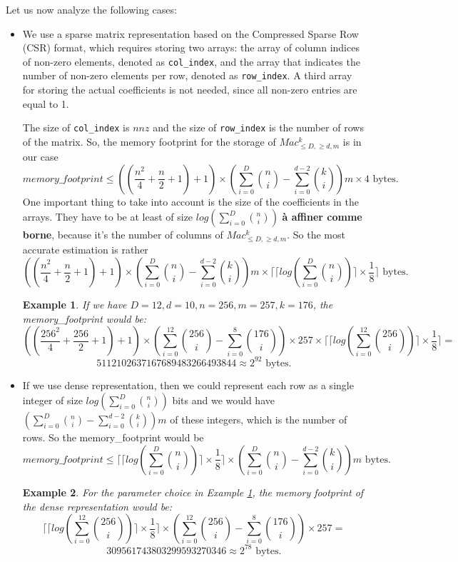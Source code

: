 \documentclass[english]{article}
\newtheorem{example}{Example}[section]
\begin{document}
		Let us now analyze the following cases:
		\begin{itemize}
			\item We use a sparse matrix representation based on the Compressed Sparse Row (CSR) format, which requires storing two arrays: the array of column indices of non-zero elements, denoted as \texttt{col\_index}, and the array that indicates the number of non-zero elements per row, denoted as \texttt{row\_index}. A third array for storing the actual coefficients is not needed, since all non-zero entries are equal to 1.
			
			The size of \texttt{col\_index} is $nnz$ and the size of \texttt{row\_index} is the number of rows of the matrix.
			So, the memory footprint for the storage of $Mac_{\leq D, \geq d, m}^k$ is in our case
			$$
				memory\_footprint \leq \left(\left(\frac{n^2}{4} + \frac{n}{2} + 1\right) + 1\right) \times \left(\sum_{i=0}^{D}\binom{n}{i} - \sum_{i=0}^{d-2}\binom{k}{i}\right)m \times 4 \text{ bytes}.
			$$
			One important thing to take into account is the size of the coefficients in the arrays. They have to be at least of size $log\left(\sum_{i=0}^{D} \binom{n}{i}\right)$ \textbf{à affiner comme borne}, because it's the number of columns of $Mac_{\leq D, \geq d, m}^k$. So the most accurate estimation is rather
			$$
				\left(\left(\frac{n^2}{4} + \frac{n}{2} + 1\right) + 1\right) \times \left(\sum_{i=0}^{D}\binom{n}{i} - \sum_{i=0}^{d-2}\binom{k}{i}\right)m \times \lceil \lceil log\left(\sum_{i=0}^{D} \binom{n}{i}\right) \rceil \times \frac{1}{8} \rceil \text{ bytes}.
			$$
			\begin{example}\label{exempleCSR}
				If we have $D = 12, d = 10, n = 256, m = 257, k=176$, the memory\_footprint would be:
				$$
					\left(\left( \frac{256^2}{4} + \frac{256}{2} + 1 \right) + 1 \right) \times \left(\sum_{i=0}^{12} \binom{256}{i} - \sum_{i=0}^{8} \binom{176}{i}\right) \times 257 \times \lceil \lceil log\left(\sum_{i=0}^{12} \binom{256}{i}\right) \rceil \times \frac{1}{8} \rceil = $$ $$ 5112102637167689483266493844 \approx 2^{92} \text{ bytes}.
				$$
			\end{example}
			\item If we use dense representation, then we could represent each row as a single integer of size $log\left(\sum_{i=0}^{D} \binom{n}{i}\right)$ bits and we would have $\left(\sum_{i=0}^{D}\binom{n}{i} - \sum_{i=0}^{d-2}\binom{k}{i}\right)m$ of these integers, which is the number of rows. So the memory\_footprint would be
			$$
				memory\_footprint \leq \lceil \lceil log\left(\sum_{i=0}^{D} \binom{n}{i}\right) \rceil \times \frac{1}{8} \rceil \times \left(\sum_{i=0}^{D}\binom{n}{i} - \sum_{i=0}^{d-2}\binom{k}{i}\right)m \text{ bytes}.
			$$
			\begin{example}
				For the parameter choice in Example \ref{exempleCSR}, the memory footprint of the dense representation would be:
				$$
					\lceil \lceil log\left(\sum_{i=0}^{12} \binom{256}{i}\right) \rceil \times \frac{1}{8} \rceil \times \left(\sum_{i=0}^{12}\binom{256}{i} - \sum_{i=0}^{8}\binom{176}{i}\right) \times 257 = $$ $$ 309561743803299593270346 \approx 2^{78} \text{ bytes}.
				$$
			\end{example}
		\end{itemize}
		
\end{document}
